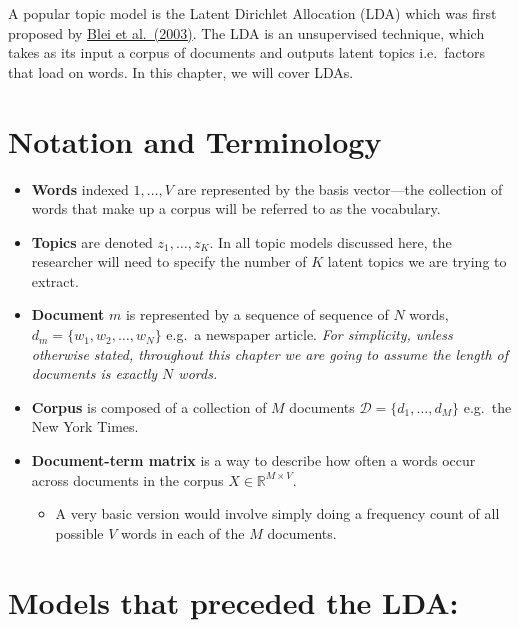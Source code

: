 \documentclass[
]{book}
\providecommand{\tightlist}{%
  \setlength{\itemsep}{0pt}\setlength{\parskip}{0pt}}
\begin{document}
A popular topic model is the Latent Dirichlet Allocation (LDA) which was first proposed by \href{https://www.jmlr.org/papers/volume3/blei03a/blei03a.pdf}{Blei et al.~(2003)}. The LDA is an unsupervised technique, which takes as its input a corpus of documents and outputs latent topics i.e.~factors that load on words. In this chapter, we will cover LDAs.

\hypertarget{notation-and-terminology}{%
\section{Notation and Terminology}\label{notation-and-terminology}}

\begin{itemize}
\tightlist
\item
  \textbf{Words} indexed \(1,\dots,V\) are represented by the basis vector---the collection of words that make up a corpus will be referred to as the vocabulary.
\item
  \textbf{Topics} are denoted \(z_1,\dots,z_K\). In all topic models discussed here, the researcher will need to specify the number of \(K\) latent topics we are trying to extract.
\item
  \textbf{Document} \(m\) is represented by a sequence of sequence of \(N\) words, \(d_m = \{w_1,w_2,\dots,w_N\}\) e.g.~a newspaper article. \emph{For simplicity, unless otherwise stated, throughout this chapter we are going to assume the length of documents is exactly \(N\) words.}
\item
  \textbf{Corpus} is composed of a collection of \(M\) documents \(\mathcal{D}=\{d_1,\dots, d_M\}\) e.g.~the New York Times.
\item
  \textbf{Document-term matrix} is a way to describe how often a words occur across documents in the corpus \(X\in \mathbb{R}^{M\times V}\).

  \begin{itemize}
  \tightlist
  \item
    A very basic version would involve simply doing a frequency count of all possible \(V\) words in each of the \(M\) documents.
  \end{itemize}
\end{itemize}

\hypertarget{models-that-preceded-the-lda}{%
\section{Models that preceded the LDA:}\label{models-that-preceded-the-lda}}
\end{document}

